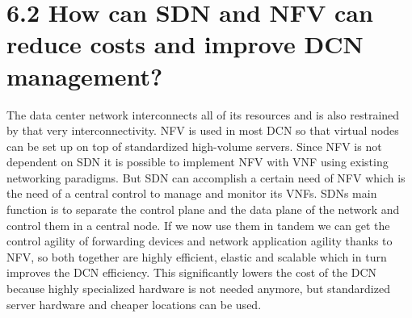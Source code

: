 \documentclass{article}
\begin{document}
	\section*{6.2 How can SDN and NFV can reduce costs and improve DCN management?}
	\begin{adjustwidth}{2em}{2em}
		The data center network interconnects all of its resources and is also restrained by that very interconnectivity. NFV is used in most DCN so that virtual nodes can be set up on top of standardized high-volume servers. Since NFV is not dependent on SDN it is possible to implement NFV with VNF using existing networking paradigms. But SDN can accomplish a certain need of NFV which is the need of a central control to manage and monitor its VNFs. SDNs main function is to separate the control plane and the data plane of the network and control them in a central node. If we now use them in tandem we can get the control agility of forwarding devices and network application agility thanks to NFV, so both together are highly efficient, elastic and scalable which in turn improves the DCN efficiency. This significantly lowers the cost of the DCN because highly specialized hardware is not needed anymore, but standardized server hardware and cheaper locations can be used.
	\end{adjustwidth}
	
\end{document}
